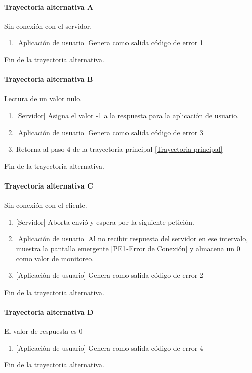 \paragraph{Trayectoria alternativa A} \label{SUB-U-CU1.5:TA}
	Sin conexión con el servidor.
	\begin{enumerate}[label=A\arabic*.]
		\item {[Aplicación de usuario]} Genera como salida código de error 1
	\end{enumerate}
	Fin de la trayectoria alternativa.

\paragraph{Trayectoria alternativa B} \label{SUB-U-CU1.5:TB}
	Lectura de un valor nulo.
	\begin{enumerate}[label=B\arabic*.]
		\item {[Servidor]} Asigna el valor -1 a la respuesta para la aplicación de usuario.
		\item {[Aplicación de usuario]} Genera como salida código de error 3
		\item Retorna al paso 4 de la trayectoria principal \hyperref[SUB-U-CU1.12:TPr]{[Trayectoria principal]}
	\end{enumerate}
	Fin de la trayectoria alternativa.

\paragraph{Trayectoria alternativa C} \label{SUB-U-CU1.5:TC}
	Sin conexión con el cliente.
	\begin{enumerate}[label=C\arabic*.]
		\item {[Servidor]} Aborta envió y espera por la siguiente petición.
		\item {[Aplicación de usuario]} Al no recibir respuesta del servidor en ese intervalo, muestra la pantalla emergente \hyperref[fig:Error de Conexion]{[PE1-Error de Conexión]} y almacena un 0 como valor de monitoreo.
		\item {[Aplicación de usuario]} Genera como salida código de error 2
	\end{enumerate}
	Fin de la trayectoria alternativa.
	
\paragraph{Trayectoria alternativa D} \label{SUB-U-CU1.5:TD}
	El valor de respuesta es 0
	\begin{enumerate}[label=D\arabic*.]
		\item {[Aplicación de usuario]} Genera como salida código de error 4
	\end{enumerate}
	Fin de la trayectoria alternativa.


